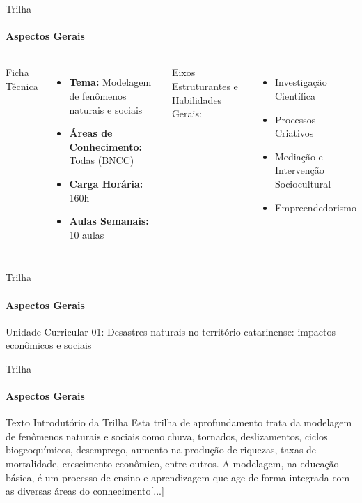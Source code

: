 \documentclass[aspectratio=169]{beamer}
\begin{document}
\begin{frame}{Trilha}
	\framesubtitle{Aspectos Gerais}
	\begin{columns}
		Ficha Técnica
		\begin{itemize}
			\item \textbf{Tema:} Modelagem de fenômenos naturais e sociais
			\item \textbf{Áreas de Conhecimento:} Todas (BNCC)
			\item \textbf{Carga Horária:} 160h
			\item \textbf{Aulas Semanais:} 10 aulas
		\end{itemize}

		Eixos Estruturantes e Habilidades Gerais:
		\begin{itemize}
			\item Investigação Científica
			\item Processos Criativos
			\item Mediação e Intervenção Sociocultural
			\item Empreendedorismo
		\end{itemize}
	\end{columns}
\end{frame}

\begin{frame}{Trilha}
	\framesubtitle{Aspectos Gerais}
	\begin{block}{Unidade Curricular 01:}
		Desastres naturais no território catarinense: impactos econômicos e sociais
	\end{block}
\end{frame}


\begin{frame}{Trilha}
	\framesubtitle{Aspectos Gerais}
	\begin{block}{Texto Introdutório da Trilha}
		Esta trilha de aprofundamento \alert<2->{trata da modelagem de fenômenos naturais e sociais} como chuva, tornados, deslizamentos, ciclos biogeoquímicos, desemprego, aumento na produção de riquezas, taxas de mortalidade, crescimento econômico, entre outros. A \alert<3->{modelagem, na educação básica, é um processo de ensino e aprendizagem que age de forma integrada com as diversas áreas do conhecimento}[...] \cite{GPF_PE:2020}
	\end{block}
\end{frame}
\end{document}
